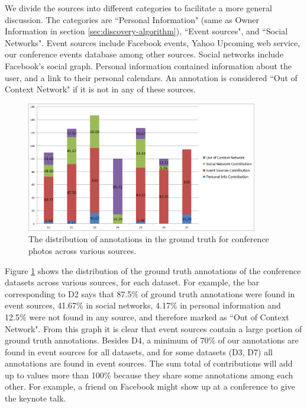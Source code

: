 We divide the sources into different categories to facilitate a more general discussion. The categories are ``Personal Information" (same as Owner Information in section \ref{sec:discovery-algorithm}), ``Event sources", and ``Social Networks". Event sources include Facebook events, Yahoo Upcoming web service, our conference events database among other sources. Social networks include Facebook's social graph. Personal information contained information about the user, and a link to their personal calendars. An annotation is considered ``Out of Context Network" if it is not in any of these sources.

\begin{figure}[t]
\centering
\includegraphics[width=0.9\textwidth]{media/gt-distro-stacked-2.png}
\caption{The distribution of annotations in the ground truth for conference photos across various sources.}
\label{fig:src-cand-distribution}
\end{figure}

Figure \ref{fig:src-cand-distribution} shows the distribution of the ground truth annotations of the conference datasets across various sources, for each dataset. For example, the bar corresponding to D2 says that 87.5\% of ground truth annotations were found in event sources, 41.67\% in social networks, 4.17\% in personal information and 12.5\% were not found in any source, and therefore marked as ``Out of Context Network". From this graph it is clear that event sources contain a large portion of ground truth annotations. Besides D4, a minimum of 70\% of our annotations are found in event sources for all datasets, and for some datasets (D3, D7) all annotations are found in event sources. The sum total of contributions will add up to values more than 100\% because they share some annotations among each other. For example, a friend on Facebook might show up at a conference to give the keynote talk.

